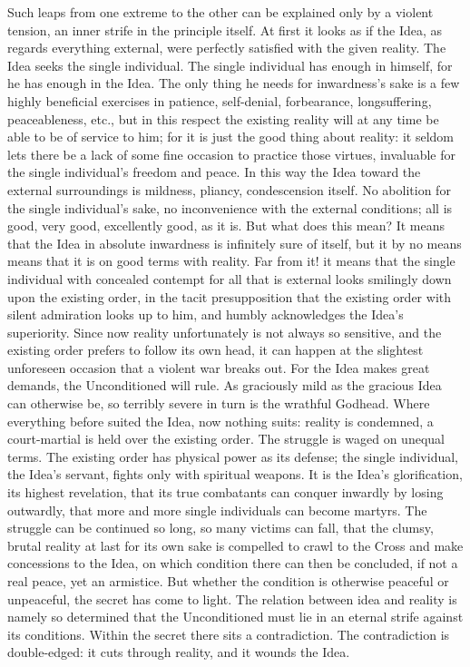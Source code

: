 \documentclass[12pt,a4paper,openany]{book}
\newcommand{\opage}[1]{\marginnote{\footnotesize\textit{[#1]}}}
\begin{document}
Such leaps from one extreme to the other
can be explained only by a violent tension, an inner
strife in the principle itself. At first it looks as if the Idea,
as regards everything external, were perfectly satisfied with
the given reality. The Idea seeks the single individual. The
single individual has enough in himself, for he has enough in the Idea.
The only thing he needs for inwardness's sake is
a few highly beneficial exercises in patience, self-denial,
forbearance, longsuffering, peaceableness, etc.,
but in this respect the existing reality will
at any time be able to be of service to him; for it is
just the good thing about reality: it seldom lets there
be a lack of some fine occasion to practice
those virtues, invaluable for the single individual's freedom and peace.
In this way the Idea toward the external surroundings
is mildness, pliancy, condescension itself. No
abolition for the single individual's sake, no inconvenience
with the external conditions; all is good, very good,
excellently good, as it is. But what does this mean?
It means that the Idea in absolute inwardness is infinitely
sure of itself, but it by no means means that
it is on good terms with reality. Far from it!
it means that the single individual with concealed contempt for all
\setcounter{footnote}{0}%
\opage{25}that is external looks smilingly down upon the existing order, in the
tacit presupposition that the existing order with silent admiration
looks up to him, and humbly acknowledges the Idea's superiority.
Since now reality unfortunately is not always
so sensitive, and the existing order prefers to follow its
own head, it can happen at the slightest unforeseen occasion
that a violent war breaks out. For the Idea
makes great demands, the Unconditioned will rule. As
graciously mild as the gracious Idea can otherwise be,
so terribly severe in turn is the wrathful Godhead. Where
everything before suited the Idea, now nothing suits: reality
is condemned, a court-martial is held over the existing order.
The struggle is waged on unequal terms. The existing order
has physical power as its defense; the single individual,
the Idea's servant, fights only with spiritual weapons. It
is the Idea's glorification, its highest revelation, that
its true combatants can conquer inwardly by
losing outwardly, that more and more single individuals can become martyrs.
The struggle can be continued so long, so many victims
can fall, that the clumsy, brutal reality
at last for its own sake is compelled to crawl to
the Cross and make concessions to the Idea, on which condition
there can then be concluded, if not a real peace,
yet an armistice. But whether the condition
is otherwise peaceful or unpeaceful, the secret has
come to light. The relation between idea and
reality is namely so determined that the Unconditioned
must lie in an eternal strife against its conditions.
Within the secret there sits a contradiction.
The contradiction is double-edged: it cuts through reality,
and it wounds the Idea.
\end{document}
